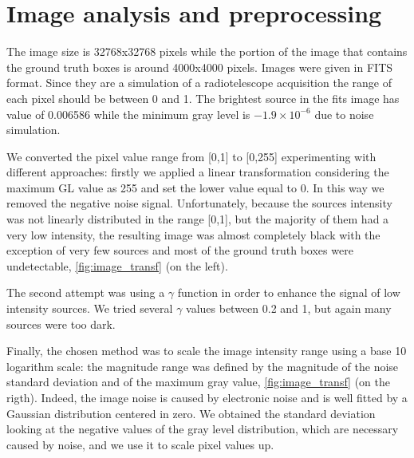\documentclass[a4paper,10pt]{report}
\begin{document}
\section{Image analysis and preprocessing}
The image size is 32768x32768 pixels while the portion of the image that contains the ground truth boxes is around 4000x4000 pixels.
Images were given in FITS format. Since they are a simulation of a radiotelescope acquisition the range of each pixel should be between 0 and 1.
The brightest source in the fits image has value of 0.006586 while the minimum gray level is  $-1.9 \times 10^{-6}$ due to noise simulation.

We converted the pixel value range from [0,1] to [0,255] experimenting with different approaches: firstly we applied a linear transformation considering the maximum GL value as 255 and set the lower value equal to 0. In this way we removed the negative noise signal. Unfortunately, because the sources intensity was not linearly distributed in the range [0,1], but the majority of them had a very low intensity, the resulting image was almost completely black with the exception of very few sources and most of the ground truth boxes were undetectable, \ref{fig:image_transf} (on the left).

The second attempt was using a $\gamma$ function in order to enhance the signal of low intensity sources. We tried several $\gamma$ values between 0.2 and 1, but again many sources were too dark.

Finally, the chosen method was to scale the image intensity range using a base 10 logarithm scale: the magnitude range was defined by the magnitude of the noise standard deviation and of the maximum gray value, \ref{fig:image_transf} (on the rigth). Indeed, the image noise is caused by electronic noise and is well fitted by a Gaussian distribution centered in zero. We obtained the standard deviation looking at the negative values of the gray level distribution, which are necessary caused by noise, and we use it to scale pixel values up.
\end{document}
